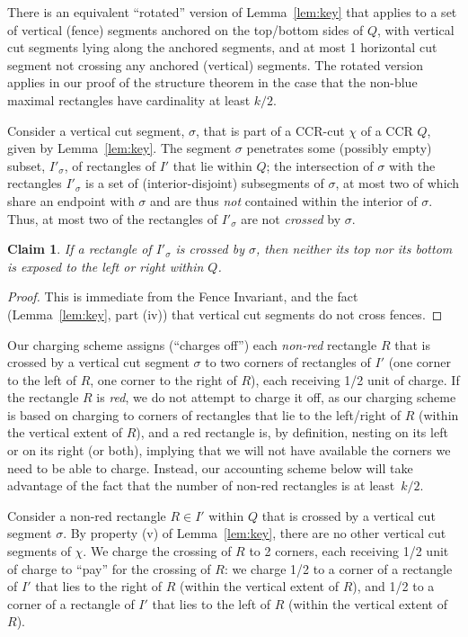 \documentclass{article}
\newtheorem{claim}[theorem]{Claim}
\begin{document}
\medskip

 There is an equivalent ``rotated'' version of
Lemma~\ref{lem:key} that applies to a set of vertical (fence) segments
anchored on the top/bottom sides of $Q$, with vertical cut segments
lying along the anchored segments, and at most 1 horizontal cut segment not
crossing any anchored (vertical) segments. The rotated version applies in our
proof of the structure theorem in the case that the non-blue maximal
rectangles have cardinality at least $k/2$.

\medskip
{}\quad
Consider a vertical cut segment, $\sigma$, that is part of a CCR-cut
$\chi$ of a CCR $Q$, given by Lemma~\ref{lem:key}.  The segment
$\sigma$ penetrates some (possibly empty) subset, $I'_\sigma$, of
rectangles of $I'$ that lie within $Q$; the intersection of $\sigma$
with the rectangles $I'_\sigma$ is a set of (interior-disjoint)
subsegments of $\sigma$, at most two of which share an endpoint with
$\sigma$ and are thus {\em not} contained within the interior of
$\sigma$. Thus, at most two of the rectangles of $I'_\sigma$ are not
{\em crossed} by $\sigma$.

\begin{claim}
  \label{fact1}
 If a rectangle of $I'_\sigma$ is crossed by $\sigma$, then neither
 its top nor its bottom is exposed to the left or right within $Q$.
\end{claim}
\begin{proof}
This is immediate from the Fence Invariant, and the fact
(Lemma~\ref{lem:key}, part (iv)) that vertical cut segments do not
cross fences.
\end{proof}

Our charging scheme assigns (``charges off'') each {\em non-red}
rectangle $R$ that is crossed by a vertical cut segment $\sigma$ to
two corners of rectangles of $I'$ (one corner to the left of $R$, one
corner to the right of $R$), each receiving 1/2 unit of charge.
%
If the rectangle $R$ is {\em red}, we do not attempt to charge it off,
as our charging scheme is based on charging to corners of rectangles
that lie to the left/right of $R$ (within the vertical extent of $R$),
and a red rectangle is, by definition, nesting on its left or on its
right (or both), implying that we will not have available the corners
we need to be able to charge. Instead, our accounting scheme below
will take advantage of the fact that the number of non-red rectangles
is at least~$k/2$.

Consider a non-red rectangle $R\in I'$ within $Q$ that is crossed by a
vertical cut segment $\sigma$.  By property (v) of
Lemma~\ref{lem:key}, there are no other
vertical cut segments of $\chi$.
%
%
We charge the crossing of $R$ to 2 corners, each receiving 1/2 unit of charge to ``pay'' for the crossing of $R$:
we charge 1/2 to a corner of a rectangle of $I'$
that lies to the right of $R$ (within the vertical extent of $R$),
and 1/2 to a corner of a rectangle of $I'$ that lies to the left of $R$ (within the vertical extent of $R$).
%
\end{document}
